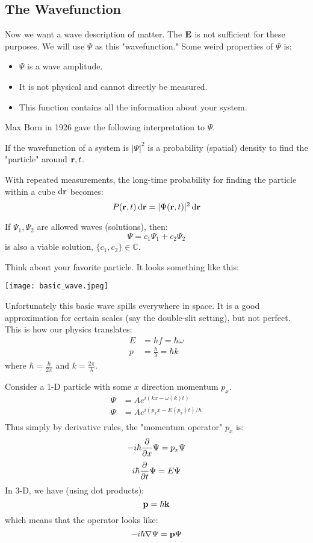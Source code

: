 \subsection{The Wavefunction}
Now we want a wave description of matter. The $\mathbf{E}$ is not sufficient for these purposes. We will use $\Psi$ as this "wavefunction." Some weird properties
of $\Psi$ is:
\begin{itemize}
    \item $\Psi$ is a wave amplitude.
    \item It is not physical and cannot directly be measured.
    \item This function contains all the information about your system.
\end{itemize}
Max Born in 1926 gave the following interpretation to $\Psi$.
\begin{theorem}
    If the wavefunction of a system is $|\Psi|^2$ is a probability (spatial) density to find the "particle" around $\mathbf{r}, t$.
\end{theorem}
With repeated measurements, the long-time probability for finding the particle within a cube $\dd{\mathbf{r}}$ becomes:
\[ P(\mathbf{r}, t) \dd{\mathbf{r}} = |\Psi(\mathbf{r}, t)|^2 \dd{\mathbf{r}} \]
\begin{theorem}[Superposition]
    If $\Psi_1, \Psi_2$ are allowed waves (solutions), then:
    \[ \Psi = c_1 \Psi_1 + c_2 \Psi_2 \]
    is also a viable solution, $\{c_1, c_2\} \in \mathbb{C}$.
\end{theorem}
Think about your favorite particle. It looks something like this:

\texttt{[image: basic\_wave.jpeg]}

Unfortunately this basic wave spills everywhere in space. It is a good approximation for certain scales (say the double-slit setting), but not perfect. This is how our physics translates: 
\begin{align*}
    E &= hf = \hbar \omega \\
    p &= \frac{h}{\lambda} = \hbar k
\end{align*}
where $\hbar = \frac{h}{2\pi}$ and $k = \frac{2\pi}{\lambda}$.

Consider a 1-D particle with some $x$ direction momentum $p_x$.
\begin{align*}
    \Psi &= A e^{i(k x - \omega(k) t)} \\
    \Psi &= Ae^{i(p_x x - E(p_x) t)/\hbar} \\
\end{align*}
Thus simply by derivative rules, the "momentum operator" $p_x$ is:
\[ - i \hbar \partialderivative{}{x} \Psi = p_x \Psi \]
\[ i \hbar \partialderivative{}{t} \Psi = E \Psi \]
In 3-D, we have (using dot products):
\[ \mathbf{p} = \hbar \mathbf{k} \]
which means that the operator looks like:
\[ - i \hbar \nabla \Psi = \mathbf{p} \Psi\]
